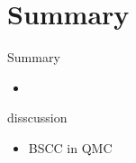 \section{Summary}
\begin{frame}{Summary}
  \begin{itemize}
    \item
  \end{itemize}
\end{frame}
\begin{frame}{disscussion}
  \begin{itemize}
    \item BSCC in QMC
  \end{itemize}
\end{frame}